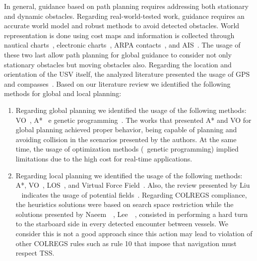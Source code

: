     In general, guidance based on path planning requires addressing both stationary and dynamic obstacles. Regarding real-world-tested work, guidance requires an accurate world model and robust methods to avoid detected obstacles. World representation is done using cost maps and information is collected through nautical charts~\cite{Larson2006Autonomous}, electronic charts~\cite{Naus2013Idea}, \ac{ARPA} contacts~\cite{Larson2006Autonomous}, and \ac{AIS}~\cite{Abdelaal2017NMPC}. The usage of these two last allow path planning for global guidance to consider not only stationary obstacles but moving obstacles also. Regarding the location and orientation of the \ac{USV} itself, the analyzed literature presented the usage of GPS~\cite{Benjamin2004COLREGS} and compasses~\cite{Annamalai2013Comparison}. Based on our literature review we identified the following methods for global and local planning:
    
    \begin{enumerate}
    
        \item Regarding global planning we identified the usage of the following methods: \ac{VO}~\cite{Larson2006Autonomous, Kuwata2014Safe, Zhuang2011Motion, Huang2019Generalized}, A*~\cite{Naeem2012COLREGS, Campbell2012Review_COLREGs, Naus2013Idea} e genetic programming~\cite{Svec2012Automated, Svec2011aAutomated}. The works that presented A* and VO for global planning achieved proper behavior, being capable of planning and avoiding collision in the scenarios presented by the authors. At the same time, the usage of optimization methods (\ie~genetic programming) implied limitations due to the high cost for real-time applications. 
        
        \item Regarding local planning we identified the usage of the following methods: A*\cite{Larson2006Autonomous, Campbell2013Automatic, Agrawal2015COLREGS}, \ac{VO}~\cite{Larson2006Autonomous, Huang2019Generalized}, \ac{LOS}~\cite{Naeem2012COLREGS}, and Virtual Force Field~\cite{Lee2004Fuzzy}. Also, the review presented by Liu \etal~\cite{Liu2016Unmanned} indicates the usage of potential fields~\cite{Healey2007Collaborative, Soltan2009Trajectory}. Regarding \ac{COLREGS} compliance, the heuristics solutions were based on search space restriction while the solutions presented by  Naeem~\etal~\cite{Naeem2012COLREGS}, Lee~\etal~\cite{Lee2004Fuzzy}, consisted in performing a hard turn to the starboard side in every detected encounter between vessels. We consider this is not a good approach since this action may lead to violation of other \ac{COLREGS} rules such as rule 10 that impose that navigation must respect \acf{TSS}.
        
    \end{enumerate}
    
